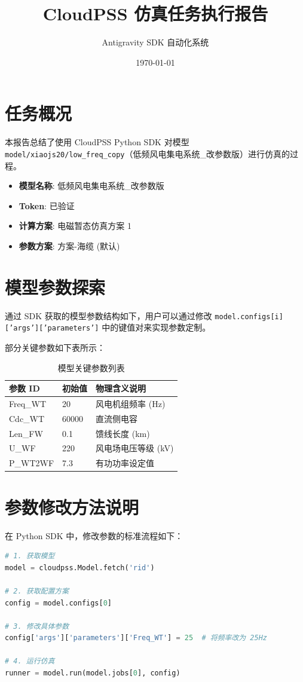 \documentclass[UTF8]{ctexart}
\title{CloudPSS 仿真任务执行报告}
\author{Antigravity SDK 自动化系统}
\date{\today}
\begin{document}
\maketitle

\section{任务概况}
本报告总结了使用 CloudPSS Python SDK 对模型 \texttt{model/xiaojs20/low\_freq\_copy}（低频风电集电系统\_改参数版）进行仿真的过程。

\begin{itemize}
    \item \textbf{模型名称}: 低频风电集电系统\_改参数版
    \item \textbf{Token}: 已验证
    \item \textbf{计算方案}: 电磁暂态仿真方案 1
    \item \textbf{参数方案}: 方案-海缆 (默认)
\end{itemize}

\section{模型参数探索}
通过 SDK 获取的模型参数结构如下，用户可以通过修改 \texttt{model.configs[i]['args']['parameters']} 中的键值对来实现参数定制。

部分关键参数如下表所示：

\begin{table}[h]
\centering
\begin{tabular}{@{}lll@{}}
\toprule
参数 ID & 初始值 & 物理含义说明 \\ \midrule
Freq\_WT & 20 & 风电机组频率 (Hz) \\
Cdc\_WT & 60000 & 直流侧电容 \\
Len\_FW & 0.1 & 馈线长度 (km) \\
U\_WF & 220 & 风电场电压等级 (kV) \\
P\_WT2WF & 7.3 & 有功功率设定值 \\ \bottomrule
\end{tabular}
\caption{模型关键参数列表}
\end{table}

\section{参数修改方法说明}
在 Python SDK 中，修改参数的标准流程如下：

\begin{lstlisting}[language=Python, basicstyle=\small\ttfamily, frame=single]
# 1. 获取模型
model = cloudpss.Model.fetch('rid')

# 2. 获取配置方案
config = model.configs[0]

# 3. 修改具体参数
config['args']['parameters']['Freq_WT'] = 25  # 将频率改为 25Hz

# 4. 运行仿真
runner = model.run(model.jobs[0], config)
\end{lstlisting}
\end{document}

